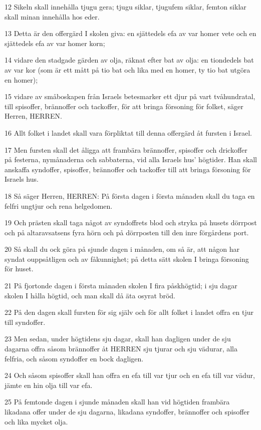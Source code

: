 \par 12 Sikeln skall innehålla tjugu gera; tjugu siklar, tjugufem siklar, femton siklar skall minan innehålla hos eder.
\par 13 Detta är den offergärd I skolen giva: en sjättedels efa av var homer vete och en sjättedels efa av var homer korn;
\par 14 vidare den stadgade gärden av olja, räknat efter bat av olja: en tiondedels bat av var kor (som är ett mått på tio bat och lika med en homer, ty tio bat utgöra en homer);
\par 15 vidare av småboskapen från Israels betesmarker ett djur på vart tvåhundratal, till spisoffer, brännoffer och tackoffer, för att bringa försoning för folket, säger Herren, HERREN.
\par 16 Allt folket i landet skall vara förpliktat till denna offergärd åt fursten i Israel.
\par 17 Men fursten skall det åligga att frambära brännoffer, spisoffer och drickoffer på festerna, nymånaderna och sabbaterna, vid alla Israels hus' högtider. Han skall anskaffa syndoffer, spisoffer, brännoffer och tackoffer till att bringa försoning för Israels hus.
\par 18 Så säger Herren, HERREN: På första dagen i första månaden skall du taga en felfri ungtjur och rena helgedomen.
\par 19 Och prästen skall taga något av syndoffrets blod och stryka på husets dörrpost och på altaravsatsens fyra hörn och på dörrposten till den inre förgårdens port.
\par 20 Så skall du ock göra på sjunde dagen i månaden, om så är, att någon har syndat ouppsåtligen och av fåkunnighet; på detta sätt skolen I bringa försoning för huset.
\par 21 På fjortonde dagen i första månaden skolen I fira påskhögtid; i sju dagar skolen I hålla högtid, och man skall då äta osyrat bröd.
\par 22 På den dagen skall fursten för sig själv och för allt folket i landet offra en tjur till syndoffer.
\par 23 Men sedan, under högtidens sju dagar, skall han dagligen under de sju dagarna offra såsom brännoffer åt HERREN sju tjurar och sju vädurar, alla felfria, och såsom syndoffer en bock dagligen.
\par 24 Och såsom spisoffer skall han offra en efa till var tjur och en efa till var vädur, jämte en hin olja till var efa.
\par 25 På femtonde dagen i sjunde månaden skall han vid högtiden frambära likadana offer under de sju dagarna, likadana syndoffer, brännoffer och spisoffer och lika mycket olja.

